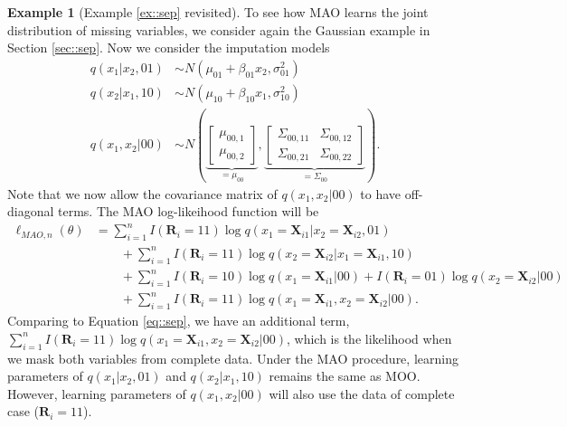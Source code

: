\documentclass[aos, preprint]{imsart}
\theoremstyle{plain}
\theoremstyle{definition}
\newtheorem*{example}{Example}
\newcommand{\bX}{\mathbf{X}}
\newcommand{\bR}{\mathbf{R}}
\begin{document}
\begin{appendix}

\begin{example}[Example \ref{ex::sep} revisited]
To see how MAO learns the joint distribution of missing variables, we consider again the 
Gaussian example in Section \ref{sec::sep}.
Now we consider the imputation models
\begin{align*}
q(x_1|x_2, 01) &\sim N(\mu_{01} + \beta_{01} x_2, \sigma^2_{01})\\
q(x_2|x_1, 10) &\sim N(\mu_{10} + \beta_{10} x_1, \sigma^2_{10})\\
q(x_1,x_2| 00) &\sim N\left(\underbrace{\begin{bmatrix}\mu_{00,1}\\
\mu_{00,2}
\end{bmatrix}}_{=\mu_{00}},
\underbrace{\begin{bmatrix}
\Sigma_{00,11} & \Sigma_{00,12}\\
\Sigma_{00,21} &\Sigma_{00,22}
\end{bmatrix}}_{=\Sigma_{00}}\right).
\end{align*}
Note that we now allow the covariance matrix of $q(x_1,x_2| 00)$
to have off-diagonal terms.
The MAO log-likeihood function will be 
\begin{equation}
\begin{aligned}
\ell_{MAO, n}(\theta)
& = \sum_{i=1}^n I(\bR_i = 11) \log q(x_1 = \bX_{i1}|x_2 = \bX_{i2}, 01) \\
&\qquad+ \sum_{i=1}^n I(\bR_i = 11)\log q(x_2 = \bX_{i2}|x_1 = \bX_{i1}, 10) \\ 
&\qquad+ \sum_{i=1}^n I(\bR_i = 10) \log q(x_1 = \bX_{i1}| 00) + I(\bR_i = 01) \log q(x_2 = \bX_{i2}| 00)\\
&\qquad+ \sum_{i=1}^n I(\bR_i = 11) \log q(x_1 = \bX_{i1}, x_2 = \bX_{i2}| 00).
\end{aligned}
\label{eq::mao::sep}
\end{equation}
Comparing to Equation \eqref{eq::sep}, we have an additional term, $\sum_{i=1}^n I(\bR_i = 11) \log q(x_1 = \bX_{i1}, x_2 = \bX_{i2}| 00)$,
which is the likelihood when we mask both variables from complete data.
Under the MAO procedure, learning parameters of $q(x_1|x_2, 01)$ and $q(x_2|x_1, 10)$
remains the same as MOO. 
However, learning parameters of $q(x_1,x_2| 00)$
will also use the data of complete case ($\bR_i = 11$). 




\end{example}
\end{appendix}
\end{document}
